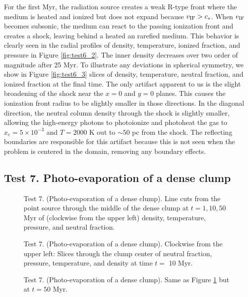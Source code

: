 \documentclass[useAMS,usenatbib]{mn2e}
\begin{document}
For the first Myr, the radiation source creates a weak R-type front
where the medium is heated and ionized but does not expand because
$v_{\rm IF} > c_s$.  When $v_{\rm IF}$ becomes subsonic, the medium
can react to the passing ionization front and creates a shock, leaving
behind a heated an rarefied medium.  This behavior is clearly seen in
the radial profiles of density, temperature, ionized fraction, and
pressure in Figure \ref{fig:test6_2}.  The inner density decreases
over two order of magnitude after 25 Myr.  To illustrate any
deviations in spherical symmetry, we show in Figure \ref{fig:test6_3}
slices of density, temperature, neutral fraction, and ionized fraction
at the final time.  The only artifact apparent to us is the slight
broadening of the shock near the $x=0$ and $y=0$ planes.  This causes
the ionization front radius to be slightly smaller in those
directions.  In the diagonal direction, the neutral column density
through the shock is slightly smaller, allowing the high-energy
photons to photoionize and photoheat the gas to $x_e = 5 \times
10^{-3}$ and $T = 2000$ K out to $\sim50$ pc from the shock.  The
reflecting boundaries are responsible for this artifact because this
is not seen when the problem is centered in the domain, removing any
boundary effects.

\subsection{Test 7. Photo-evaporation of a dense clump}

\begin{figure}
  \caption{\label{fig:test7_1} Test 7. (Photo-evaporation of a dense
    clump).  Line cuts from the point source through the middle of the
    dense clump at $t = 1, 10, 50$ Myr of (clockwise from the upper
    left) density, temperature, pressure, and neutral fraction.}
\end{figure}

\begin{figure*}
  \caption{\label{fig:test7_2} Test 7. (Photo-evaporation of a dense
    clump).  Clockwise from the upper left: Slices through the clump
    center of neutral fraction, pressure, temperature, and density at
    time $t =$ 10 Myr.}
\end{figure*}

\begin{figure*}
  \caption{\label{fig:test7_3} Test 7. (Photo-evaporation of a dense
    clump).  Same as Figure \ref{fig:test7_1} but at $t = 50$ Myr.}
\end{figure*}
\end{document}
